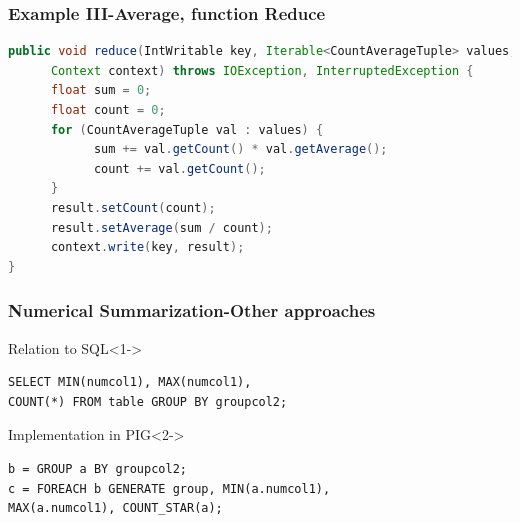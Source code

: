 \documentclass[xcolor=dvipsnames,dvip,notes=show,table]{beamer}
\begin{document}
\begin{frame}[fragile]
  \frametitle{Example III-Average, function Reduce}

\begin{lstlisting}[language=Java]
public void reduce(IntWritable key, Iterable<CountAverageTuple> values,
      Context context) throws IOException, InterruptedException {
      float sum = 0;
      float count = 0;
      for (CountAverageTuple val : values) {
            sum += val.getCount() * val.getAverage();
            count += val.getCount();
      }
      result.setCount(count);
      result.setAverage(sum / count);
      context.write(key, result);
}
\end{lstlisting}

\end{frame}



\begin{frame}[fragile]
  \frametitle{Numerical Summarization-Other approaches}
  \begin{block}{Relation to SQL}<1->
  
  \begin{lstlisting}
SELECT MIN(numcol1), MAX(numcol1),
COUNT(*) FROM table GROUP BY groupcol2;
\end{lstlisting}
\end{block}

\begin{exampleblock}{Implementation in PIG}<2->

\begin{lstlisting}
b = GROUP a BY groupcol2;
c = FOREACH b GENERATE group, MIN(a.numcol1),
MAX(a.numcol1), COUNT_STAR(a);
\end{lstlisting}

\end{exampleblock}

\end{frame}


\end{document}
